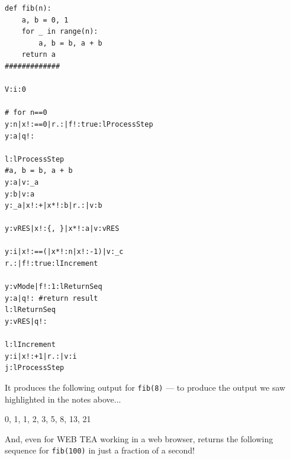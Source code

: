 \documentclass[a4paper, 18pt]{book} %
\begin{document}
{{{{\begin{tcolorbox}[teaterminalstyle, title=TEA Program: Fibonacci in TEA v2.1, breakable]
\begin{lstlisting}[language=TEA,breaklines=true,]
def fib(n):
    a, b = 0, 1
    for _ in range(n):
        a, b = b, a + b
    return a
#############

V:i:0

# for n==0
y:n|x!:==0|r.:|f!:true:lProcessStep
y:a|q!:

l:lProcessStep 
#a, b = b, a + b
y:a|v:_a
y:b|v:a
y:_a|x!:+|x*!:b|r.:|v:b

y:vRES|x!:{, }|x*!:a|v:vRES

y:i|x!:==(|x*!:n|x!:-1)|v:_c
r.:|f!:true:lIncrement

y:vMode|f!:1:lReturnSeq
y:a|q!: #return result
l:lReturnSeq
y:vRES|q!:

l:lIncrement
y:i|x!:+1|r.:|v:i
j:lProcessStep
   \end{lstlisting}
  \end{tcolorbox}
  \caption{TEA APPLICATION: Compute Fibonacci Numbers}
  \label{FIGYAPP2}
}


\vspace{2em}

It produces the following output for \texttt{fib(8)} --- to produce the output we saw highlighted in the notes above...


  \vspace{2em}
 \begin{tcbverbatim}[title=Sample OUTPUT 1 from TEA Fibonacci v1 for fib(8)]
0, 1, 1, 2, 3, 5, 8, 13, 21
  \end{tcbverbatim}
 \vspace{2em}

And, even for WEB TEA working in a web browser, returns the following sequence for \texttt{fib(100)} in just a fraction of a second!


}}}
\end{document}
